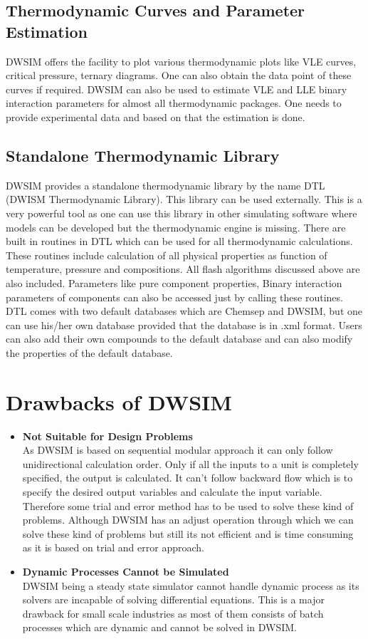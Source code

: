 \documentclass[12pt]{report}
\begin{document}
\subsection {Thermodynamic Curves and Parameter Estimation}
DWSIM offers the facility to plot various thermodynamic plots like VLE curves, critical pressure, ternary diagrams. One can also obtain the data point of these curves if required.
DWSIM can also be used to estimate VLE and LLE binary interaction parameters for almost all thermodynamic packages. One needs to provide experimental data and based on that the estimation is done.

\subsection{Standalone Thermodynamic Library}
DWSIM provides a standalone thermodynamic library by the name DTL (DWISM Thermodynamic Library). This library can be used externally.
This is a very powerful tool as one can use this library in other simulating software where models can be developed but the thermodynamic engine is missing.
There are built in routines in DTL which can be used for all thermodynamic calculations. These routines include calculation of all physical properties as function of temperature, pressure and compositions. All flash algorithms discussed above are also included. Parameters like pure component properties, Binary interaction parameters of components can also be accessed just by calling these routines.
DTL comes with two default databases which are Chemsep and DWSIM, but one can use his/her own database provided that the database is in .xml format. Users can also add their own compounds to the default database and can also modify the properties of the default database.

\section{Drawbacks of DWSIM}
\begin{itemize}
\item {\textbf{Not Suitable for Design Problems}} \\
As DWSIM is based on sequential modular approach it can only follow unidirectional calculation order. Only if all the inputs to a unit is completely specified, the output is calculated. It can't follow backward flow which is to specify the desired output variables and calculate the input variable. Therefore some trial and error method has to be used to solve these kind of problems. Although DWSIM has an adjust operation through which we can solve these kind of problems but still its not efficient and is time consuming as it is based on trial and error approach.

\item{\textbf{Dynamic Processes Cannot be Simulated}} \\
DWSIM being a steady state simulator cannot handle dynamic process as its solvers are incapable of solving differential equations. This is a major drawback for small scale industries as most of them consists of batch processes which are dynamic and cannot be solved in DWSIM.

\end{itemize}
\end{document}
